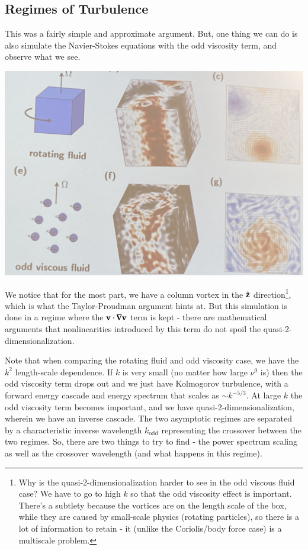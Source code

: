 \subsection{Regimes of Turbulence}
This was a fairly simple and approximate argument. But, one thing we can do is also simulate the Navier-Stokes equations with the odd viscosity term, and observe what we see. 

\begin{center}
    \includegraphics[scale=0.4]{Lectures/Images/lec15-simulation.png}
\end{center}

We notice that for the most part, we have a column vortex in the $\hat{\mathbf{z}}$ direction\footnote{Why is the quasi-2-dimensionalization harder to see in the odd viscous fluid case? We have to go to high $k$ so that the odd viscosity effect is important. There's a subtlety because the vortices are on the length scale of the box, while they are caused by small-scale physics (rotating particles), so there is a lot of information to retain - it (unlike the Coriolis/body force case) is a multiscale problem.}, which is what the Taylor-Proudman argument hints at. But this simulation is done in a regime where the $\v{v} \cdot \nabla \v{v}$ term is kept - there are mathematical arguments that nonlinearities introduced by this term do not spoil the quasi-2-dimensionalization.

Note that when comparing the rotating fluid and odd viscosity case, we have the $k^2$ length-scale dependence. If $k$ is very small (no matter how large $\nu^0$ is) then the odd viscosity term drops out and we just have Kolmogorov turbulence, with a forward energy cascade and energy spectrum that scales as $\sim k^{-5/3}$. At large $k$ the odd viscosity term becomes important, and we have quasi-2-dimensionalization, wherein we have an inverse cascade. The two asymptotic regimes are separated by a characteristic inverse wavelength $k_{\text{odd}}$ representing the crossover between the two regimes. So, there are two things to try to find - the power spectrum scaling as well as the crossover wavelength (and what happens in this regime).


